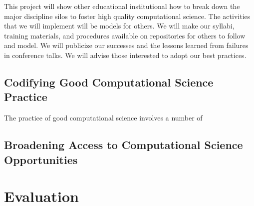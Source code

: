 \documentclass[11pt]{NSFamsart}
\begin{document}
This project will show other educational institutional how to break down the major discipline silos to foster high quality computational science.  The activities that we will implement will be models for others.  We will make our syllabi, training materials, and procedures available on repositories for others to follow and model.  We will publicize our successes and the lessons learned from failures in conference talks.  We will advise those interested to adopt our best practices.

\subsection{Codifying Good Computational Science Practice}
The practice of good computational science involves a number of 

\subsection{Broadening Access to Computational Science Opportunities}

\section{Evaluation}


\newpage
\clearpage
\setcounter{page}{1}



{\renewcommand\addcontentsline[3]{} 
\renewcommand{\refname}{{\Large\textbf{References Cited}}}                   %
\renewcommand{\bibliofont}{\normalsize}

}
\end{document}
